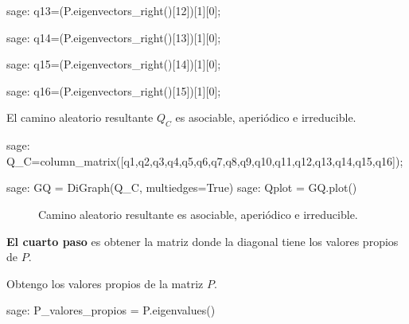 \begin{sagecommandline}
    sage: q13=(P.eigenvectors_right()[12])[1][0];
\end{sagecommandline}

\begin{sagecommandline}
    sage: q14=(P.eigenvectors_right()[13])[1][0];
\end{sagecommandline}

\begin{sagecommandline}
    sage: q15=(P.eigenvectors_right()[14])[1][0];
\end{sagecommandline}

\begin{sagecommandline}
    sage: q16=(P.eigenvectors_right()[15])[1][0];
\end{sagecommandline}

\par El camino aleatorio resultante $Q_C$ es asociable, aperiódico e irreducible.

\begin{sagecommandline}
    sage: Q_C=column_matrix([q1,q2,q3,q4,q5,q6,q7,q8,q9,q10,q11,q12,q13,q14,q15,q16]);
\end{sagecommandline}

\begin{sagecommandline}
    sage: GQ = DiGraph(Q_C, multiedges=True)
    sage: Qplot = GQ.plot()
\end{sagecommandline}
\begin{figure}[H]
    \centering
    \label{caminoZ_2}
    \caption{Camino aleatorio resultante es asociable, aperiódico e irreducible.}
\end{figure}

\par \textbf{El cuarto paso} es obtener la matriz donde la diagonal tiene los valores propios de $P$.
\par Obtengo los valores propios de la matriz $P$.
\begin{sagecommandline}
    sage: P_valores_propios = P.eigenvalues()
\end{sagecommandline}

